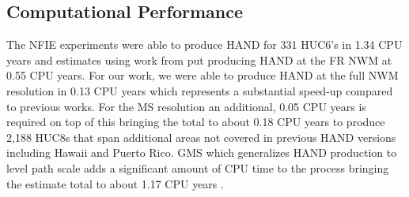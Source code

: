 \subsection{Computational Performance}
\label{ssec:compuational_performance}
%
The NFIE experiments were able to produce HAND for 331 HUC6's in 1.34 CPU years \cite{liu2016cybergis} and estimates using work from  put producing HAND at the FR NWM at 0.55 CPU years. 
For our work, we were able to produce HAND at the full NWM resolution in 0.13 CPU years which represents a substantial speed-up compared to previous works.
For the MS resolution an additional, 0.05 CPU years is required on top of this bringing the total to about 0.18 CPU years to produce 2,188 HUC8s that span additional areas not covered in previous HAND versions including Hawaii and Puerto Rico.
GMS which generalizes HAND production to level path scale adds a significant amount of CPU time to the process bringing the estimate total to about 1.17 CPU years .
%
